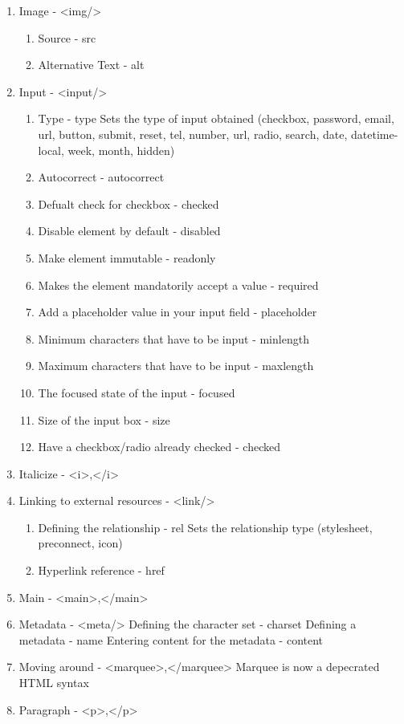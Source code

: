 \documentclass[11pt]{article}
\begin{document}
\begin{enumerate}
\item Image - <img/>
\begin{enumerate}
\item Source - src
\item Alternative Text - alt
\end{enumerate}
\item Input - <input/>
\begin{enumerate}
\item Type - type
Sets the type of input obtained (checkbox, password, email, url, button, submit, reset, tel,
number, url, radio, search, date, datetime-local, week, month, hidden)
\item Autocorrect - autocorrect
\item Defualt check for checkbox - checked
\item Disable element by default - disabled
\item Make element immutable - readonly
\item Makes the element mandatorily accept a value - required
\item Add a placeholder value in your input field - placeholder
\item Minimum characters that have to be input - minlength
\item Maximum characters that have to be input - maxlength
\item The focused state of the input - focused
\item Size of the input box - size
\item Have a checkbox/radio already checked - checked
\end{enumerate}
\item Italicize - <i>,</i>
\item Linking to external resources - <link/>
\begin{enumerate}
\item Defining the relationship - rel
Sets the relationship type (stylesheet, preconnect, icon)
\item Hyperlink reference - href
\end{enumerate}
\item Main - <main>,</main>
\item Metadata - <meta/>
Defining the character set - charset
Defining a metadata - name
Entering content for the metadata - content
\item Moving around - <marquee>,</marquee>
Marquee is now a depecrated HTML syntax
\item Paragraph - <p>,</p>
\begin{enumerate}

\end{enumerate}
\end{enumerate}
\end{document}
